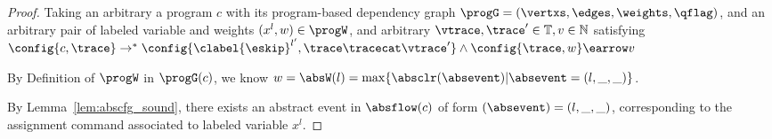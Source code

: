 \begin{proof}
  Taking an arbitrary a program ${c}$ with its program-based dependency graph $\progG = (\vertxs, \edges, \weights, \qflag)$, 
  and an arbitrary pair of labeled variable and weights $(x^l, w) \in \progW$, 
  and arbitrary $\vtrace, \trace' \in \mathbb{T},
  v \in \mathbb{N}$ satisfying
  \\
  $\config{{c}, \trace} \to^{*} \config{\clabel{\eskip}^{l'}, \trace\tracecat\vtrace'} 
  \land 
  \config{\trace, w} \earrow v$

  
  By Definition of $\progW$ in $\progG(c)$, we know 
  $  w = \absW(l) = \max \{ \absclr(\absevent) | \absevent = (l, \_, \_)\}$.

  
  By Lemma~\ref{lem:abscfg_sound}, there exists an abstract event in $\absflow(c)$ of form $(\absevent) = (l, \_, \_)$,
  corresponding to the assignment command associated to labeled variable $x^l$. 


\end{proof}
